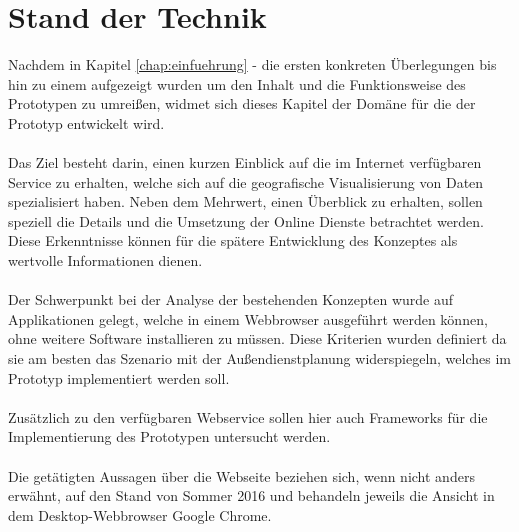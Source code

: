 \documentclass[../Bachelorarbeit.tex]{subfiles}
\begin{document}
\chapter{Stand der Technik}
\label{chap:analyse}

Nachdem in Kapitel \ref{chap:einfuehrung} -  die ersten konkreten Überlegungen bis hin zu einem  aufgezeigt wurden um den Inhalt und die Funktionsweise des Prototypen zu umreißen, widmet sich dieses Kapitel der Domäne für die der Prototyp entwickelt wird.\\
\\
Das Ziel besteht darin, einen kurzen Einblick auf die im Internet verfügbaren Service zu erhalten, welche sich auf die geografische Visualisierung von Daten spezialisiert haben. 
Neben dem Mehrwert, einen Überblick  zu erhalten, sollen speziell die Details und die Umsetzung der Online Dienste betrachtet werden.
Diese Erkenntnisse können für die spätere Entwicklung  des Konzeptes als wertvolle Informationen dienen.\\
\\
Der Schwerpunkt bei der Analyse der bestehenden Konzepten wurde auf Applikationen gelegt, welche in einem Webbrowser ausgeführt werden können, ohne weitere Software installieren zu müssen.
Diese Kriterien wurden definiert da sie am besten das Szenario mit der Außendienstplanung widerspiegeln, welches im Prototyp implementiert werden soll.\\
\\
Zusätzlich zu den verfügbaren Webservice sollen hier auch Frameworks für die Implementierung des Prototypen untersucht werden. \\
\\
Die getätigten Aussagen über die Webseite beziehen sich, wenn nicht anders erwähnt, auf den Stand von Sommer 2016 und behandeln jeweils die Ansicht in dem Desktop-Webbrowser Google Chrome.
\end{document}
